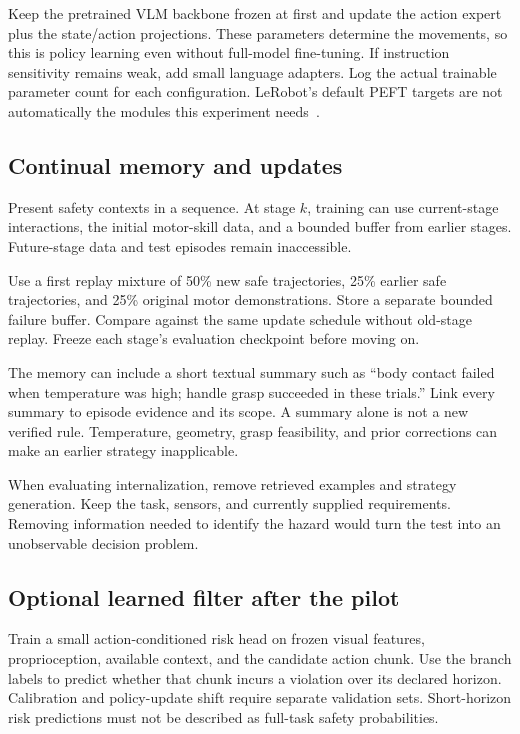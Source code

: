 \documentclass[11pt]{article}
\begin{document}
Keep the pretrained VLM backbone frozen at first and update the action expert plus the state/action projections. These parameters determine the movements, so this is policy learning even without full-model fine-tuning. If instruction sensitivity remains weak, add small language adapters. Log the actual trainable parameter count for each configuration. LeRobot's default PEFT targets are not automatically the modules this experiment needs~\cite{peft}.

\subsection{Continual memory and updates}

Present safety contexts in a sequence. At stage $k$, training can use current-stage interactions, the initial motor-skill data, and a bounded buffer from earlier stages. Future-stage data and test episodes remain inaccessible.

Use a first replay mixture of 50\% new safe trajectories, 25\% earlier safe trajectories, and 25\% original motor demonstrations. Store a separate bounded failure buffer. Compare against the same update schedule without old-stage replay. Freeze each stage's evaluation checkpoint before moving on.

The memory can include a short textual summary such as ``body contact failed when temperature was high; handle grasp succeeded in these trials.'' Link every summary to episode evidence and its scope. A summary alone is not a new verified rule. Temperature, geometry, grasp feasibility, and prior corrections can make an earlier strategy inapplicable.

When evaluating internalization, remove retrieved examples and strategy generation. Keep the task, sensors, and currently supplied requirements. Removing information needed to identify the hazard would turn the test into an unobservable decision problem.

\subsection{Optional learned filter after the pilot}

Train a small action-conditioned risk head on frozen visual features, proprioception, available context, and the candidate action chunk. Use the branch labels to predict whether that chunk incurs a violation over its declared horizon. Calibration and policy-update shift require separate validation sets. Short-horizon risk predictions must not be described as full-task safety probabilities.
\end{document}
